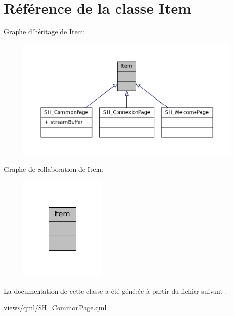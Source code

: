 \hypertarget{classItem}{\section{Référence de la classe Item}
\label{classItem}
}


Graphe d'héritage de Item\-:
\nopagebreak
\begin{figure}[H]
\begin{center}
\leavevmode
\includegraphics[width=350pt]{classItem__inherit__graph}
\end{center}
\end{figure}


Graphe de collaboration de Item\-:
\nopagebreak
\begin{figure}[H]
\begin{center}
\leavevmode
\includegraphics[width=120pt]{classItem__coll__graph}
\end{center}
\end{figure}


La documentation de cette classe a été générée à partir du fichier suivant \-:\begin{DoxyCompactItemize}
\item 
views/qml/\hyperlink{SH__CommonPage_8qml}{S\-H\-\_\-\-Common\-Page.\-qml}\end{DoxyCompactItemize}
